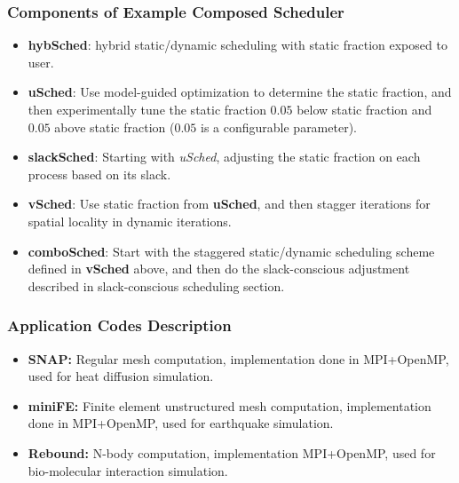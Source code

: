\begin{frame}[label=combinedSched]
\frametitle{Components of Example Composed Scheduler}
\begin{itemize}
\small \item \small \textbf{hybSched}: hybrid static/dynamic scheduling
with static fraction exposed to user.\\
\item \small \textbf{uSched}: Use model-guided optimization to
  determine the static fraction,  and then experimentally tune the
  static fraction $0.05$ below static fraction and $0.05$ above static
  fraction ($0.05$ is a configurable parameter).
\item \small \textbf{slackSched}: Starting with \textit{uSched},
adjusting the static fraction on each process based on its slack.
\item \small \textbf{vSched}: Use static fraction from \textbf{uSched},
  and then stagger iterations for spatial locality in dynamic
  iterations.
\item \small \textbf{comboSched}: Start with the staggered static/dynamic scheduling scheme defined in \textbf{vSched} above, and then do the slack-conscious adjustment described in slack-conscious scheduling section.
\end{itemize}
\end{frame}

\begin{frame}[label=appsAndExpSetup]
\frametitle{Application Codes Description}
\begin{itemize}
\small \item \small {\bf SNAP:} Regular mesh computation, 
implementation done in MPI+OpenMP, used for heat diffusion simulation.
\item \small {\bf miniFE:} Finite element unstructured mesh computation, implementation done in MPI+OpenMP, used for earthquake simulation. 
\item \small {\bf Rebound:} N-body computation, implementation
  MPI+OpenMP, used for bio-molecular interaction simulation.
\end{itemize} 
\end{frame} 

